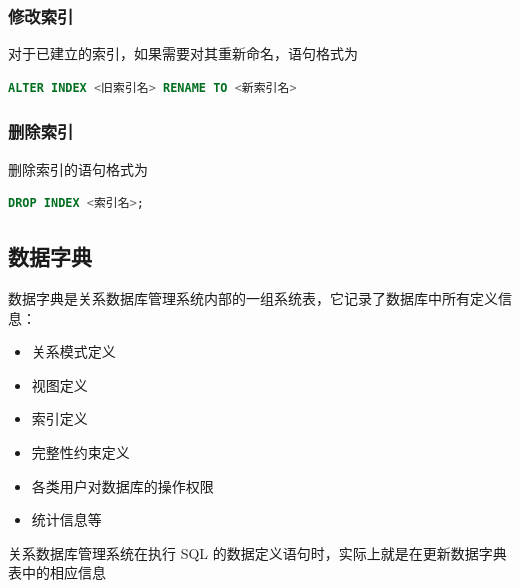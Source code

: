 \subsubsection{修改索引}
对于已建立的索引，如果需要对其重新命名，语句格式为
\begin{lstlisting}[language=sql]
ALTER INDEX <旧索引名> RENAME TO <新索引名>
\end{lstlisting}

\subsubsection{删除索引}
删除索引的语句格式为
\begin{lstlisting}[language=sql]
DROP INDEX <索引名>;
\end{lstlisting}

\subsection{数据字典}
数据字典是关系数据库管理系统内部的一组系统表，它记录了数据库中所有定义信息：
\vspace{-0.8em}
\begin{multicols}{2}
    \begin{itemize}
        \item 关系模式定义
        \item 视图定义
        \item 索引定义
        \item 完整性约束定义
        \item 各类用户对数据库的操作权限
        \item 统计信息等
    \end{itemize}
\end{multicols}
\vspace{-1em}

关系数据库管理系统在执行 SQL 的数据定义语句时，实际上就是在更新数据字典表中的相应信息


